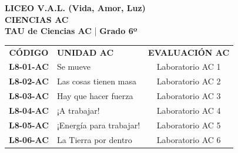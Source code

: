\documentclass[12pt, letterpaper]{article}
\begin{document}
	\begin{center} 
		{\huge \textbf{\color{valblue} LICEO V.A.L. (Vida, Amor, Luz)}}\\[0.2cm] 
		{\Large \textbf{CIENCIAS AC}}\\[0.2cm] 
		{\large \textbf{TAU de Ciencias AC} \quad | \quad \textbf{Grado 6º}} 
	\end{center} 
	\vspace{0.8cm} 
	
	\renewcommand{\arraystretch}{4.0}
	
	\begin{center} 
		\large 
		\begin{tabularx}{\textwidth}{cXc} 
			\textbf{CÓDIGO} & \textbf{UNIDAD AC} & \textbf{EVALUACIÓN AC} \\ 
			\textbf{L8-01-AC} & Se mueve &  Laboratorio AC 1 \\ 
			\rowcolor{valgray} \textbf{L8-02-AC} & Las cosas tienen masa &  Laboratorio AC 2 \\ 
			\textbf{L8-03-AC} & Hay que hacer fuerza &  Laboratorio AC 3 \\ 
			\rowcolor{valgray} \textbf{L8-04-AC} & ¡A trabajar! &  Laboratorio AC 4 \\ 
			\textbf{L8-05-AC} & ¡Energía para trabajar! &  Laboratorio AC 5 \\ 
			\rowcolor{valgray} \textbf{L8-06-AC} & La Tierra por dentro &  Laboratorio AC 6 \\ 
		\end{tabularx} 
	\end{center} 
\end{document}
